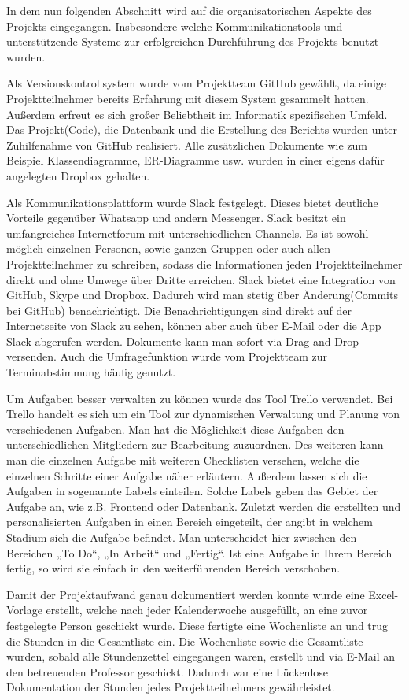  In dem nun folgenden Abschnitt wird auf die organisatorischen Aspekte des Projekts eingegangen. Insbesondere welche Kommunikationstools und unterstützende Systeme zur erfolgreichen Durchführung des Projekts benutzt wurden.

Als Versionskontrollsystem wurde vom Projektteam GitHub gewählt, da einige Projektteilnehmer bereits Erfahrung mit diesem System gesammelt hatten. Außerdem erfreut es sich großer Beliebtheit im Informatik spezifischen Umfeld. Das Projekt(Code), die Datenbank und die Erstellung des Berichts wurden unter Zuhilfenahme von GitHub realisiert. Alle zusätzlichen Dokumente wie zum Beispiel Klassendiagramme, ER-Diagramme usw. wurden in einer eigens dafür angelegten Dropbox gehalten.

Als Kommunikationsplattform wurde Slack festgelegt. Dieses bietet deutliche Vorteile gegenüber Whatsapp und andern Messenger. Slack besitzt ein umfangreiches Internetforum mit unterschiedlichen Channels. Es ist sowohl möglich einzelnen Personen, sowie ganzen Gruppen oder auch allen Projektteilnehmer zu schreiben, sodass die Informationen jeden Projektteilnehmer direkt und ohne Umwege über Dritte erreichen. Slack bietet eine Integration von GitHub, Skype und Dropbox. Dadurch wird man stetig über Änderung(Commits bei GitHub) benachrichtigt. Die Benachrichtigungen sind direkt auf der Internetseite von Slack zu sehen, können aber auch über E-Mail oder die App Slack abgerufen werden. Dokumente kann man sofort via Drag and Drop versenden. Auch die Umfragefunktion wurde vom Projektteam zur Terminabstimmung häufig genutzt.

Um Aufgaben besser verwalten zu können wurde das Tool Trello verwendet. Bei Trello handelt es sich um ein Tool zur dynamischen Verwaltung und Planung von verschiedenen Aufgaben. Man hat die Möglichkeit diese Aufgaben den unterschiedlichen Mitgliedern zur Bearbeitung zuzuordnen. Des weiteren kann man die einzelnen Aufgabe mit weiteren Checklisten versehen, welche die einzelnen Schritte einer Aufgabe näher erläutern. Außerdem lassen sich die Aufgaben in sogenannte Labels einteilen. Solche Labels geben das Gebiet der Aufgabe an, wie z.B. Frontend oder Datenbank.
Zuletzt werden die erstellten und personalisierten Aufgaben in einen Bereich eingeteilt, der angibt in welchem Stadium sich die Aufgabe befindet. Man unterscheidet hier zwischen den Bereichen „To Do“, „In Arbeit“ und „Fertig“. Ist eine Aufgabe in Ihrem Bereich fertig, so wird sie einfach in den weiterführenden Bereich verschoben.

Damit der Projektaufwand genau dokumentiert werden konnte wurde eine Excel-Vorlage erstellt, welche nach jeder Kalenderwoche ausgefüllt, an eine zuvor festgelegte Person geschickt wurde. Diese fertigte eine Wochenliste an und trug die Stunden in die Gesamtliste ein. Die Wochenliste sowie die Gesamtliste wurden, sobald alle Stundenzettel eingegangen waren, erstellt und via E-Mail an den betreuenden Professor geschickt. Dadurch war eine Lückenlose Dokumentation der Stunden jedes Projektteilnehmers gewährleistet.

